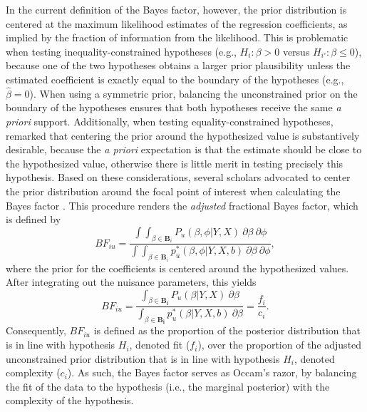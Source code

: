 \documentclass[review, 3p, authoryear]{elsarticle} %
\begin{document}
In the current definition of the Bayes factor, however, the prior distribution is centered at the maximum likelihood estimates of the regression coefficients, as implied by the fraction of information from the likelihood.
This is problematic when testing inequality-constrained hypotheses (e.g., \(H_i: \beta > 0\) versus \(H_{i'}: \beta \leq 0\)), because one of the two hypotheses obtains a larger prior plausibility unless the estimated coefficient is exactly equal to the boundary of the hypotheses (e.g., \(\hat{\beta}=0\)).
When using a symmetric prior, balancing the unconstrained prior on the boundary of the hypotheses ensures that both hypotheses receive the same \emph{a priori} support.
Additionally, when testing equality-constrained hypotheses, \citet{jeffreys_1961} remarked that centering the prior around the hypothesized value is substantively desirable, because the \emph{a priori} expectation is that the estimate should be close to the hypothesized value, otherwise there is little merit in testing precisely this hypothesis.
Based on these considerations, several scholars advocated to center the prior distribution around the focal point of interest when calculating the Bayes factor \citep{gu_approximated_2018, mulder_prior_2014, zellner_siow_1980, mulder_gu_bayesian_2021}.
This procedure renders the \emph{adjusted} fractional Bayes factor, which is defined by
\[
BF_{iu} = \frac{
  \int \int_{\beta \in \boldsymbol{B}_i} P_u(\beta, \phi | Y, X) ~ \partial \beta ~ \partial \phi
} {
  \int \int_{\beta \in \boldsymbol{B}_i} p^*_u(\beta, \phi| Y, X, b) ~ \partial \beta ~ \partial \phi
},
\]
where the prior for the coefficients is centered around the hypothesized values.
After integrating out the nuisance parameters, this yields
\[
BF_{iu} = \frac{
  \int_{\beta \in \boldsymbol{B_i}} P_u (\beta | Y, X) ~ \partial \beta
}{
  \int_{\beta \in \boldsymbol{B_i}} p^*_u(\beta | Y, X, b) ~ \partial \beta
}
= \frac{f_i}{c_i}.
\]
Consequently, \(BF_{iu}\) is defined as the proportion of the posterior distribution that is in line with hypothesis \(H_i\), denoted fit (\(f_i\)), over the proportion of the adjusted unconstrained prior distribution that is in line with hypothesis \(H_i\), denoted complexity (\(c_i\)).
As such, the Bayes factor serves as Occam's razor, by balancing the fit of the data to the hypothesis (i.e., the marginal posterior) with the complexity of the hypothesis.
\end{document}
